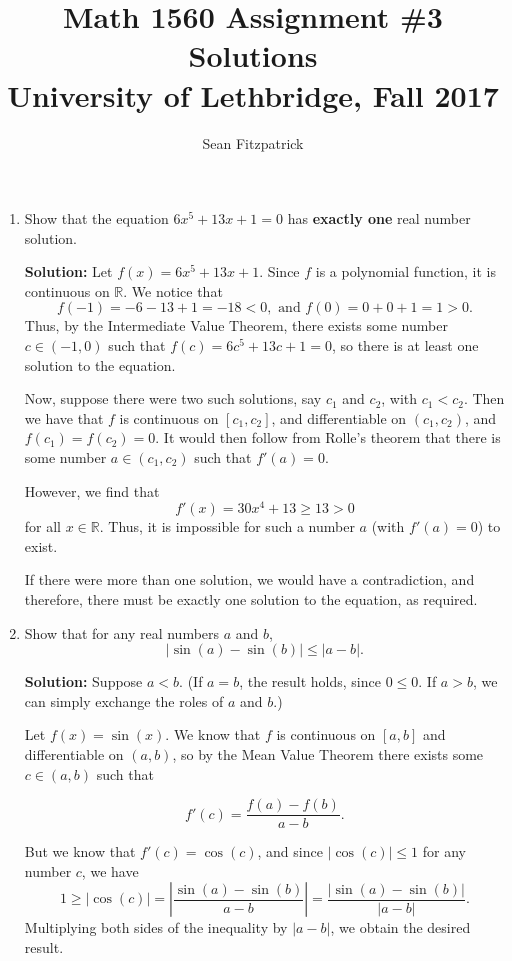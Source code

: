 \documentclass[letterpaper,12pt]{article}
\title{Math 1560 Assignment \#3 Solutions\\University of Lethbridge, Fall 2017}
\author{Sean Fitzpatrick}
\newcommand{\abs}[1]{\left\lvert #1\right\rvert}
\newcommand{\R}{\mathbb{R}}
\begin{document}
 \maketitle


\begin{enumerate}
\item Show that the equation $6x^5+13x+1=0$ has \textbf{exactly one} real number solution.

\medskip

\textbf{Solution:} Let $f(x)=6x^5+13x+1$. Since $f$ is a polynomial function, it is continuous on $\R$. We notice that 
\[
f(-1) = -6-13+1=-18<0, \text{ and } f(0) = 0+0+1=1>0.
\]
Thus, by the Intermediate Value Theorem, there exists some number $c\in (-1,0)$ such that $f(c) = 6c^5+13c+1=0$, so there is at least one solution to the equation.

Now, suppose there were two such solutions, say $c_1$ and $c_2$, with $c_1<c_2$. Then we have that $f$ is continuous on $[c_1,c_2]$, and differentiable on $(c_1,c_2)$, and $f(c_1)=f(c_2)=0$. It would then follow from Rolle's theorem that there is some number $a\in (c_1,c_2)$ such that $f'(a)=0$.

However, we find that
\[
f'(x) = 30x^4+13\geq 13>0
\]
for all $x\in\R$. Thus, it is impossible for such a number $a$ (with $f'(a)=0$) to exist. 

If there were more than one solution, we would have a contradiction, and therefore, there must be exactly one solution to the equation, as required.

\pagebreak

\item Show that for any real numbers $a$ and $b$,
\[
\abs{\sin(a)-\sin(b)}\leq \abs{a-b}.
\]

\medskip

\textbf{Solution:} Suppose $a<b$. (If $a=b$, the result holds, since $0\leq 0$. If $a>b$, we can simply exchange the roles of $a$ and $b$.)

Let $f(x)=\sin(x)$. We know that $f$ is continuous on $[a,b]$ and differentiable on $(a,b)$, so by the Mean Value Theorem there exists some $c\in (a,b)$ such that 

\[
f'(c) = \frac{f(a)-f(b)}{a-b}.
\]

But we know that $f'(c) = \cos(c)$, and since $\abs{\cos(c)}\leq 1$ for any number $c$, we have
\[
1\geq \abs{\cos(c)} = \abs{\frac{\sin(a)-\sin(b)}{a-b}} = \frac{\abs{\sin(a)-\sin(b)}}{\abs{a-b}}.
\]
Multiplying both sides of the inequality by $\abs{a-b}$, we obtain the desired result.


\end{enumerate}
\end{document}
